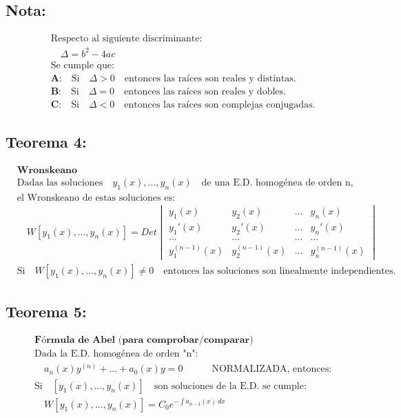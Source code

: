 \documentclass[a4paper,12pt,numbers=noenddot]{scrreprt}
\begin{document}
\subsection*{Nota:}
\begin{align*}
    &\text{Respecto al siguiente discriminante:}\\
    &\quad \Delta = b^2 - 4ac\\
    &\text{Se cumple que:}\\
    &\textbf{A:} \quad \text{Si} \quad \Delta > 0 \quad \text{entonces las raíces son reales y distintas.}\\
    &\textbf{B:} \quad \text{Si} \quad \Delta = 0 \quad \text{entonces las raíces son reales y dobles.}\\
    &\textbf{C:} \quad \text{Si} \quad \Delta < 0 \quad \text{entonces las raíces son complejas conjugadas.}
\end{align*}

\subsection*{Teorema 4:}
\begin{align*}
    &\textbf{Wronskeano}\\
    &\text{Dadas las soluciones} \quad y_1(x),...,y_n(x) \quad \text{de una E.D. homogénea de orden n,}\\
    &\text{el Wronskeano de estas soluciones es:}\\
    &\quad W{[y_1(x),...,y_n(x)]} = Det \begin{vmatrix}
        y_1(x) & y_2(x) & ... & y_n(x)\\
        y_1'(x) & y_2'(x) & ... & y_n'(x)\\
        ... & ... & ... & ...\\
        y_1^{(n-1)}(x) & y_2^{(n-1)}(x) & ... & y_n^{(n-1)}(x)
    \end{vmatrix}\\
    &\text{Si} \quad W{[y_1(x),...,y_n(x)]} \not = 0 \quad \text{entonces las soluciones son linealmente independientes.}
\end{align*}

\subsection*{Teorema 5:}
\begin{align*}
    &\textbf{Fórmula de Abel (para comprobar/comparar)}\\
    &\text{Dada la E.D. homogénea de orden "n":}\\
    &\quad a_n(x)y^{(n)}+...+a_0(x)y = 0 \quad \quad \quad \text{NORMALIZADA, entonces:}\\
    &\text{Si} \quad {[y_ 1(x), ..., y_n(x)]} \quad \text{son soluciones de la E.D. se cumple:}\\
    &\quad {W[y_1(x),...,y_n(x)]} = C_0 e^{-\int a_{n-1}(x)\,dx}
\end{align*}
\end{document}
